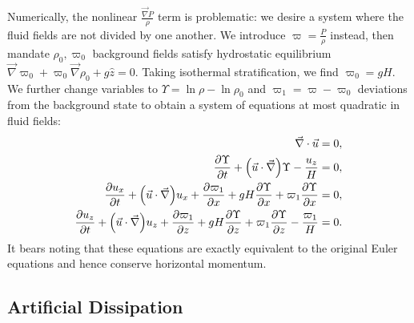 \documentclass[twocolumn,
        nofootinbib, %
        usenames, %
        aps,
        prd,
        dvipsnames %
    ]{revtex4-1}%
\newcommand*{\pd}[2]{\frac{\partial#1}{\partial#2}}
\DeclarePairedDelimiter\p{\lparen}{\rparen}
\begin{document}
Numerically, the nonlinear $\frac{\vec{\nabla}P}{\rho}$ term is problematic: we
desire a system where the fluid fields are not divided by one another. We
introduce $\varpi = \frac{P}{\rho}$ instead, then mandate $\rho_0, \varpi_0$
background fields satisfy hydrostatic equilibrium $\vec{\nabla}\varpi_0 +
\varpi_0 \vec{\nabla}\rho_0 + g\hat{z} = 0$. Taking isothermal stratification,
we find $\varpi_0 = gH$. We further change variables to $\Upsilon = \ln \rho -
\ln \rho_0$ and $\varpi_1 = \varpi - \varpi_0$ deviations from the background
state to obtain a system of equations at most quadratic in fluid fields:
\begin{subequations}\label{se:nl_var}
    \begin{align}
        \vec{\nabla} \cdot \vec{u} &= 0,\\
        \pd{\Upsilon}{t} + \p*{\vec{u} \cdot \vec{\nabla}} \Upsilon
            - \frac{u_z}{H} &= 0,\\
        \pd{u_x}{t} + \p*{\vec{u} \cdot \vec{\nabla}}u_x
            + \pd{\varpi_1}{x} + gH\pd{\Upsilon}{x}
            + \varpi_1 \pd{\Upsilon}{x} &= 0,\\
        \pd{u_z}{t} + \p*{\vec{u} \cdot \vec{\nabla}}u_z
            + \pd{\varpi_1}{z} + gH\pd{\Upsilon}{z}
            + \varpi_1 \pd{\Upsilon}{z} - \frac{\varpi_1}{H} &= 0.
    \end{align}
\end{subequations}
It bears noting that these equations are exactly equivalent to the original
Euler equations and hence conserve horizontal momentum.

\subsection{Artificial Dissipation}
\end{document}
